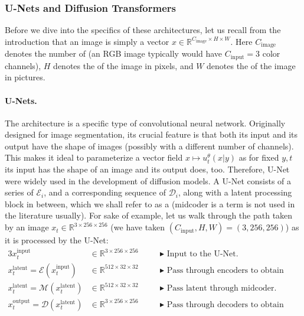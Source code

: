 \subsubsection{U-Nets and Diffusion Transformers}
Before we dive into the specifics of these architectures, let us recall from the introduction that an image is simply a vector $x \in \mathbb{R}^{C_{\text{image}} \times H \times W}$. Here $C_{\text{image}}$ denotes the number of  (an RGB image typically would have $C_{\text{input}} = 3$ color channels), $H$ denotes the  of the image in pixels, and $W$ denotes the  of the image in pictures. %

\paragraph{U-Nets.} The  architecture \citep{ronneberger2015u} is a specific type of convolutional neural network. Originally designed for image segmentation, its crucial feature is that both its input and its output have the shape of images (possibly with a different number of channels). This makes it ideal to parameterize a vector field $x\mapsto u_t^\theta(x|y)$ as for fixed $y,t$ its input has the shape of an image and its output does, too. Therefore, U-Net were widely used in the development of diffusion models. A U-Net consists of a series of  $\mathcal{E}_i$, and a corresponding sequence of  $\mathcal{D}_i$, along with a latent processing block in between, which we shall refer to as a  (midcoder is a term is not used in the literature usually). For sake of example, let us walk through the path taken by an image $x_t \in \mathbb{R}^{3 \times 256 \times 256}$ (we have taken $(C_{\text{input}}, H, W) = (3, 256, 256)$) as it is processed by the U-Net:
\begin{alignat*}{3}
    x^{\text{input}}_t &\in \mathbb{R}^{3 \times 256 \times 256} \quad  
    && \blacktriangleright\,\,\text{Input to the U-Net.}\\
    x^{\text{latent}}_t = \mathcal{E}(x^{\text{input}}_t) &\in \mathbb{R}^{512 \times 32 \times 32} \quad && \blacktriangleright\,\,\text{Pass through encoders to obtain latent.}\\
    x^{\text{latent}}_t = \mathcal{M}(x^{\text{latent}}_t) &\in \mathbb{R}^{512 \times 32 \times 32} \quad && \blacktriangleright\,\,\text{Pass latent through midcoder.}\\
    x^{\text{output}}_t = \mathcal{D}(x^{\text{latent}}_t) &\in \mathbb{R}^{3 \times 256 \times 256} \quad && \blacktriangleright\,\,\text{Pass through decoders to obtain output.}
\end{alignat*}

